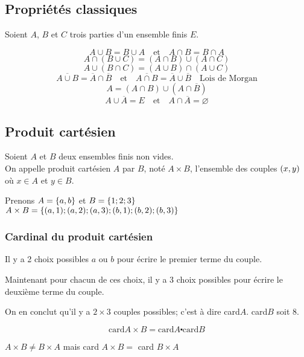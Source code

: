 \subsection*{Propriétés classiques}
Soient $A $, $ B $ et  $ C$ trois parties d'un ensemble finis $ E $.

 \[A \cup B= B \cup A \quad \textrm{et} \quad A\cap B = B \cap A \]
\[ A\cap (B\cup C)=(A\cap B)\cup (A \cap C)  \]
\[  A\cup(B\cap C)=(A\cup B)\cap(A \cup C) \]
\[ \overline{A\cup B}= \overline{A} \cap \overline{B} \quad \textrm{et} \quad \overline{A\cap B} = \overline{A}\cup \overline{B}\quad \textrm{Lois de  Morgan} \]
\[  A= (A\cap B) \cup (A\cap \overline{B}) \]
\[ A \cup \overline{A}= E \quad \textrm{et}\quad A\cap \overline{A} =\varnothing\]
\subsection*{Produit cartésien}
\begin{definition}
Soient $A $ et  $B $ deux ensembles finis non vides.\\
On appelle produit cartésien $ A$ par $B $, noté $A\times B$, l'ensemble des couples $ \left(x, y\right) $ où $x\in A $ et $y\in B. $
\end{definition}
\begin{example}
Prenons $ A=\left\{a, b\right\} $ et $ B= \left\{1; 2; 3\right\} $\\
$ A\times B=\left\{(a, 1); (a, 2);(a,3);(b,1);(b,2);(b,3)  \right\} $
\end{example}

\subsubsection*{Cardinal du produit cartésien }
Il y a 2 choix possibles $ a$ ou  $ b$ pour écrire le premier terme du couple. 


Maintenant pour chacun de ces choix, il y a 3 choix possibles pour écrire le deuxième terme du couple.



On en conclut qu'il y a $ 2 \times 3 $ couples possibles; c'est à dire  card$ A$.  card$ B $ soit 8.
\begin{theorem}
\[\textrm{card} A\times B = \textrm{card}A \centerdot \textrm{card}B  \]
\end{theorem}
\begin{remark}
$ A \times B \neq B \times A $ mais card $ A\times B =$ card $ B\times A $
\end{remark}

